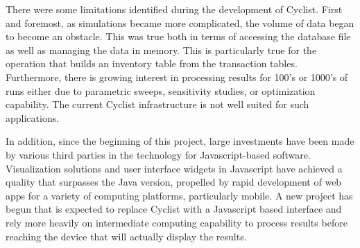 There were some limitations identified during the development of Cyclist.
First and foremost, as \Cyclus simulations became more complicated, the volume
of data began to become an obstacle.  This was true both in terms of accessing
the database file as well as managing the data in memory.  This is
particularly true for the operation that builds an inventory table from the
transaction tables.  Furthermore, there is growing interest in processing
results for 100's or 1000's of \Cyclus runs either due to parametric sweeps,
sensitivity studies, or optimization capability.  The current Cyclist
infrastructure is not well suited for such applications.

In addition, since the beginning of this project, large investments have been
made by various third parties in the technology for Javascript-based software.
Visualization solutions and user interface widgets in Javascript have achieved
a quality that surpasses the Java version, propelled by rapid development of
web apps for a variety of computing platforms, particularly mobile.  A new
project has begun that is expected to replace Cyclist with a Javascript based
interface and rely more heavily on intermediate computing capability to
process results before reaching the device that will actually display the
results.
